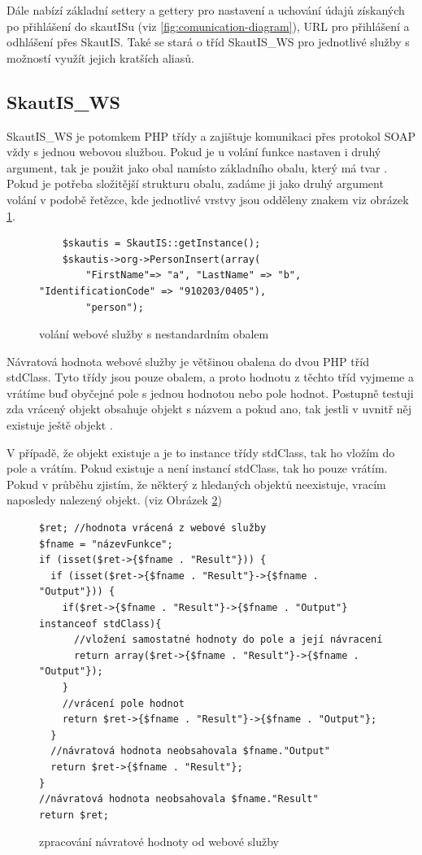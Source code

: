 \documentclass[thesis=B,czech]{FITthesis}[2011/06/14]
\begin{document}
Dále nabízí základní settery a gettery pro nastavení a uchování údajů získaných po přihlášení do skautISu (viz \ref{fig:comunication-diagram}), URL pro přihlášení a odhlášení přes SkautIS. Také se stará o  tříd SkautIS\_WS pro jednotlivé služby s možností využít jejich kratších aliasů. 

\subsection{SkautIS\_WS}
SkautIS\_WS je potomkem PHP třídy  a zajištuje komunikaci přes protokol SOAP vždy s jednou webovou službou. Pokud je u volání funkce nastaven i druhý argument, tak je použit jako obal namísto základního obalu, který má tvar . Pokud je potřeba složitější strukturu obalu, zadáme ji jako druhý argument volání v podobě řetězce, kde jednotlivé vrstvy jsou odděleny znakem \uv{/} viz obrázek \ref{SkautISAdvanceCover}. 

\begin{figure}[h]\centering
	\begin{verbatim}
	$skautis = SkautIS::getInstance();
	$skautis->org->PersonInsert(array(
		"FirstName"=> "a", "LastName" => "b", "IdentificationCode" => "910203/0405"),
		"person");
	\end{verbatim}
	\caption{volání webové služby s nestandardním obalem}\label{SkautISAdvanceCover}
\end{figure}

Návratová hodnota webové služby je většinou obalena do dvou PHP tříd stdClass. Tyto třídy jsou pouze obalem, a proto hodnotu z těchto tříd vyjmeme a vrátíme buď obyčejné pole s jednou hodnotou nebo pole hodnot. Postupně testuji zda vrácený objekt obsahuje objekt s názvem  a pokud ano, tak jestli v uvnitř něj existuje ještě objekt .

V případě, že objekt  existuje a je to instance třídy stdClass, tak ho vložím do pole a vrátím. Pokud existuje a není instancí stdClass, tak ho pouze vrátím.
Pokud v průběhu zjistím, že některý z hledaných objektů neexistuje, vracím naposledy nalezený objekt. (viz Obrázek \ref{skautisReturnValue})
\begin{figure}[h]\centering
	\begin{verbatim}
$ret; //hodnota vrácená z webové služby
$fname = "názevFunkce";
if (isset($ret->{$fname . "Result"})) {
  if (isset($ret->{$fname . "Result"}->{$fname . "Output"})) {
    if($ret->{$fname . "Result"}->{$fname . "Output"} instanceof stdClass){
      //vložení samostatné hodnoty do pole a její návracení
      return array($ret->{$fname . "Result"}->{$fname . "Output"});
    }
    //vrácení pole hodnot
    return $ret->{$fname . "Result"}->{$fname . "Output"};
  }
  //návratová hodnota neobsahovala $fname."Output"
  return $ret->{$fname . "Result"};
}
//návratová hodnota neobsahovala $fname."Result"
return $ret; 
	\end{verbatim}
	\caption{zpracování návratové hodnoty od webové služby}\label{skautisReturnValue}
\end{figure}
\end{document}
